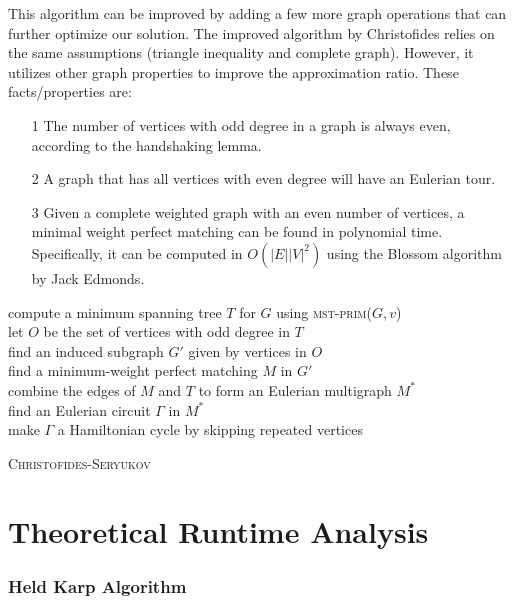 \documentclass[12pt]{report}
\begin{document}
  This algorithm can be improved by adding a few more graph operations that can further optimize our solution.
  The improved algorithm by Christofides relies on the same assumptions (triangle inequality and complete graph). 
  However, it utilizes other graph properties to improve the approximation ratio. These facts/properties are:
  \begin{enumerate}
    \item[1] The number of vertices with odd degree in a graph is always even, according to the handshaking lemma. 
    \item[2] A graph that has all vertices with even degree will have an Eulerian tour. 
    \item[3] Given a complete weighted graph with an even number of vertices, a minimal weight perfect matching can be found in polynomial 
     time. Specifically, it can be computed in $O(|E||V|^2)$  using the Blossom algorithm by Jack Edmonds.
  \end{enumerate} 
  
  
  \begin{algorithm*}
  
    compute a minimum spanning tree $T$ for $G$ using \textsc{mst-prim}($G, v$) \\
    let $O$ be the set of vertices with odd degree in $T$ \\
    find an induced subgraph $G'$ given by vertices in $O$ \\
    find a minimum-weight perfect matching $M$ in $G'$ \\
    combine the edges of $M$ and $T$ to form an Eulerian multigraph $M^*$ \\
    find an Eulerian circuit $\Gamma$ in $M^*$ \\
    make $\Gamma$ a Hamiltonian cycle by skipping repeated vertices \\
    \caption{\textsc{Christofides-Seryukov}}
\end{algorithm*}

\newpage
\chapter{Theoretical Runtime Analysis}
\subsection{Held Karp Algorithm}
\end{document}
